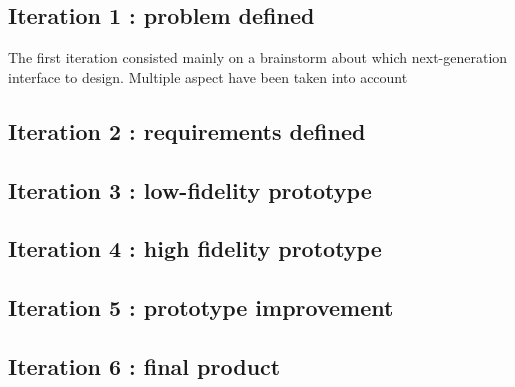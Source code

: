 \documentclass[11pt,a4paper]{article}
\begin{document}
\subsection{Iteration 1 : problem defined}

The first iteration consisted mainly on a brainstorm about which next-generation interface to design.
Multiple aspect have been taken into account


\subsection{Iteration 2 : requirements defined}



\subsection{Iteration 3 : low-fidelity prototype}


\subsection{Iteration 4 : high fidelity prototype}


\subsection{Iteration 5 : prototype improvement }



\subsection{Iteration 6 : final product}

\end{document}
